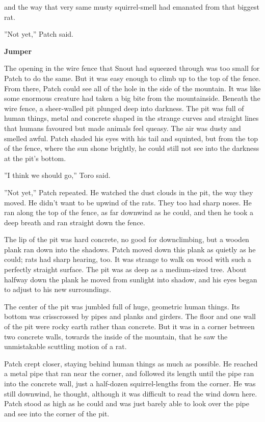 \documentclass[11pt]{article}
\begin{document}
 and the way that very same musty squirrel-smell had emanated from that biggest rat.\par
 ''Not yet,'' Patch said.\par
\par
{\bf Jumper\par
}\par
 The opening in the wire fence that Snout had squeezed through was too small for Patch to do the same. But it was easy enough to climb up to the top of the fence. From there, Patch could see all of the hole in the side of the mountain. It was like some enormous creature had taken a big bite from the mountainside. Beneath the wire fence, a sheer-walled pit plunged deep into darkness. The pit was full of human things, metal and concrete shaped in the strange curves and straight lines that humans favoured but made animals feel queasy. The air was dusty and smelled awful. Patch shaded his eyes with his tail and squinted, but from the top of the fence, where the sun shone brightly, he could still not see into the darkness at the pit's bottom.\par
 ''I think we should go,'' Toro said.\par
 ''Not yet,'' Patch repeated. He watched the dust clouds in the pit, the way they moved. He didn't want to be upwind of the rats. They too had sharp noses. He ran along the top of the fence, as far downwind as he could, and then he took a deep breath and ran straight down the fence.\par
 The lip of the pit was hard concrete, no good for downclimbing, but a wooden plank ran down into the shadows. Patch moved down this plank as quietly as he could; rats had sharp hearing, too. It was strange to walk on wood with such a perfectly straight surface. The pit was as deep as a medium-sized tree. About halfway down the plank he moved from sunlight into shadow, and his eyes began to adjust to his new surroundings.\par
 The center of the pit was jumbled full of huge, geometric human things. Its bottom was crisscrossed by pipes and planks and girders. The floor and one wall of the pit were rocky earth rather than concrete. But it was in a corner between two concrete walls, towards the inside of the mountain, that he saw the unmistakable scuttling motion of a rat.\par
 Patch crept closer, staying behind human things as much as possible. He reached a metal pipe that ran near the corner, and followed its length until the pipe ran into the concrete wall, just a half-dozen squirrel-lengths from the corner. He was still downwind, he thought, although it was difficult to read the wind down here. Patch stood as high as he could and was just barely able to look over the pipe and see into the corner of the pit.\par
\end{document}
